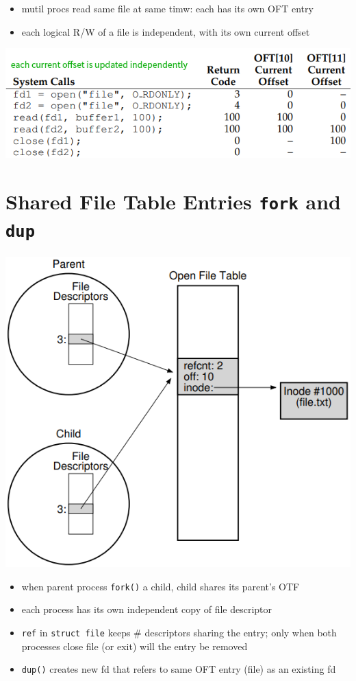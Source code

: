\begin{itemize}
\item mutil procs read same file at same timw: each has its own OFT entry
\item each logical R/W of a file is independent, with its own current offset
\end{itemize}
\includegraphics[width=\linewidth]{imgs/fs_read_conc}
\section*{Shared File Table Entries \texttt{fork} and \texttt{dup}}
\begin{minipage}{.4\linewidth}
  \includegraphics[width=\linewidth]{imgs/fs_shared_ote}
\end{minipage}
\begin{minipage}{.6\linewidth}
  \flushleft
  \begin{itemize}
  \item when parent process \texttt{fork()} a child, child shares its parent's OTF
  \item each process has its own independent copy of file descriptor
  \item \texttt{ref} in \texttt{struct file} keeps \# descriptors sharing the entry; only when both processes close file (or exit) will the entry be removed
  \item \texttt{dup()} creates new fd that refers to same OFT entry (file) as an existing fd
  \end{itemize}
\end{minipage}
